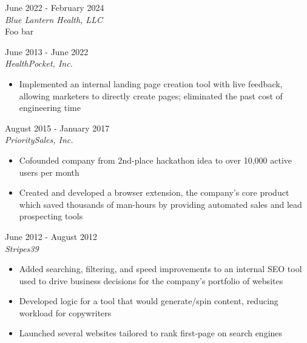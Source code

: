 \documentclass{resume}
\begin{document}
\begin{spacing}{1.2}
\begin{paracol}{2}
		\switchcolumn
		\small {}
		
		{\large{}}
		\hfill{\color{subcontent} June 2022 - February 2024}\\
		\textit{Blue Lantern Health, LLC}\\
		Foo bar

		\medskip

		{\large{}}
		\hfill{\color{subcontent} June 2013 - June 2022}\\
		\textit{HealthPocket, Inc.}

		\nointerlineskip
		\begin{itemize}
			\item Implemented an internal landing page creation tool with live feedback, allowing marketers to directly create pages; eliminated the past cost of engineering time
		\end{itemize}

		\medskip

		{\large{}}
		\hfill{\color{subcontent} August 2015 - January 2017}\\
		\textit{PrioritySales, Inc.}

		\nointerlineskip
		\begin{itemize}
			\item Cofounded company from 2nd-place hackathon idea to over 10,000 active users per month
			\item Created and developed a browser extension, the company’s core product which saved thousands of man-hours by providing automated sales and lead prospecting tools
		\end{itemize}

		\medskip

		{\large{}}
		\hfill{\color{subcontent} June 2012 - August 2012}\\
		\textit{Stripes39}

		\nointerlineskip
		\begin{itemize}
			\item Added searching, filtering, and speed improvements to an internal SEO tool used to drive business decisions for the company’s portfolio of websites
			\item Developed logic for a tool that would generate/spin content, reducing workload for copywriters
			\item Launched several websites tailored to rank first-page on search engines
		\end{itemize}


\end{paracol}
\end{spacing}
\end{document}
